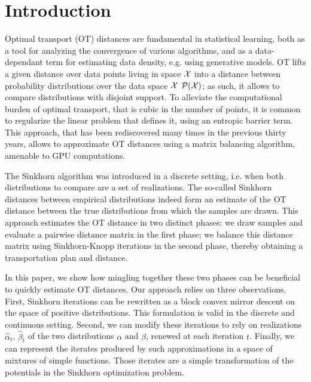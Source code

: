 \section{Introduction}

Optimal transport (OT) distances are fundamental in statistical learning, both
as a tool for analyzing the convergence of various algorithms, and as a
data-dependant term for estimating data density, e.g. using generative models.
OT lifts a given distance over data points living in space $\mathcal{X}$ into a distance
between probability distributions over the data space $\mathcal{X}$ $\mathcal{P}(\mathcal{X})$; as such,
it allows to compare distributions with disjoint support. To alleviate the
computational burden of optimal transport, that is cubic in the number of
points, it is common to regularize the linear problem that defines it, using an
entropic barrier term. This approach, that has been rediscovered many times in
the previous thirty years, allows to approximate OT distances using a matrix
balancing algorithm, amenable to GPU computations.

The Sinkhorn algorithm was introduced in a discrete setting, i.e. when both
distributions to compare are a set of realizations. The so-called Sinkhorn
distances between empirical distributions indeed form an estimate of the OT
distance between the true distributions from which the samples are drawn. This
approach estimates the OT distance in two distinct phases: we draw samples and
evaluate a pairwise distance matrix in the first phase; we balance this distance
matrix using Sinkhorn-Knopp iterations in the second phase, thereby obtaining a
transportation plan and distance.

In this paper, we show how mingling together these two phases can be beneficial
to quickly estimate OT distances.  Our approach relies on three observations. First,
Sinkhorn iterations can be rewritten as a block convex mirror descent on the
space of positive distributions. This formulation is valid in the discrete and
continuous setting. Second, we can modify these iterations to rely on
realizations $\hat \alpha_t$, $\hat \beta_t$ of the two distributions $\alpha$
and $\beta$, renewed at each iteration $t$. Finally, we can represent the
iterates produced by such approximations in a space of mixtures of simple
functions. Those iterates are a simple transformation of the potentials in the
Sinkhorn optimization problem.

